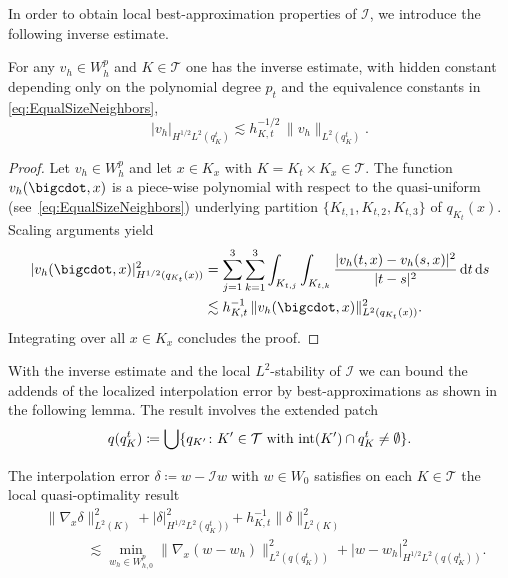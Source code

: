 \documentclass{amsart}
\providecommand{\tria}{\mathcal{T}}
\providecommand{\dt}{\,\mathrm{d}t}
\providecommand{\ds}{\,\mathrm{d}s}
\begin{document}
In order to obtain local best-approximation properties of $\mathcal{I}$, we introduce the following inverse estimate.
\begin{lemma}\label{lem:inverseEst}
For any $v_h \in W_h^p$ and $K\in \tria$ one has the inverse estimate, with hidden constant depending only on the polynomial degree $p_t$ and the equivalence constants in \eqref{eq:EqualSizeNeighbors}, 
\begin{equation*}
\lvert v_h \rvert_{H^{1/2}L^2(q_{K}^t)} \lesssim h_{K,t}^{-1/2}\, \lVert v_h\rVert_{L^2(q_K^t)}.
\end{equation*}  
\end{lemma}
\begin{proof}
Let $v_h \in W_h^p$ and let $x\in K_x$ with $K=K_t\times K_x\in \tria$. The function $v_h(\bigcdot,x)$ is a piece-wise polynomial with respect to the quasi-uniform (see~\eqref{eq:EqualSizeNeighbors}) underlying partition $\lbrace K_{t,1},K_{t,2},K_{t,3} \rbrace$ of $q_{K_t}(x)$. Scaling arguments yield
\begin{align*}
\lvert v_h(\bigcdot,x) \rvert_{H^{1/2}(q_{K_t}(x))}^2 &= \sum_{j = 1}^3 \sum_{k=1}^3 \int_{K_{t,j}} \int_{K_{t,k}} \frac{|v_h(t,x) -v_h(s,x) |^2}{|t-s|^2} \dt \ds \\
&\lesssim h_{K,t}^{-1} \, \lVert v_h(\bigcdot,x)  \rVert_{L^2(q_{K_t}(x))}^2.
\end{align*}
Integrating over all $x\in K_x$ concludes the proof.
\end{proof}
%
With the inverse estimate and the local $L^2$-stability of $\mathcal{I}$ we can bound the addends of the localized interpolation error by best-approximations as shown in the following lemma. The result involves the extended patch 
\begin{equation*}
q(q_K^t) \coloneqq \bigcup \lbrace q_{K'} \colon K'\in \tria\text{ with }\textup{int}(K') \cap q_K^t \neq \emptyset\rbrace.
\end{equation*}
\begin{lemma}\label{lem:LocalQuasiOpt}
The interpolation error $\delta \coloneqq w - \mathcal{I} w$ with $w\in W_0$ satisfies on each $K\in \tria$ the local quasi-optimality result
\begin{align*}
&\lVert  \nabla_x \delta \rVert_{L^2(K)}^2 + \lvert  \delta \rvert_{H^{1/2}L^2(q^t_K))}^2 + h_{K,t}^{-1} \lVert \delta \rVert_{L^2(K)}^2 \\
& \qquad\quad  \lesssim \min_{w_h \in W^p_{h,0}} \lVert  \nabla_x (w-w_h) \rVert_{L^2(q(q_K^t))}^2 + \lvert w - w_h \rvert^2_{H^{1/2}L^2(q(q_K^t))}.
\end{align*}
\end{lemma}
\end{document}
